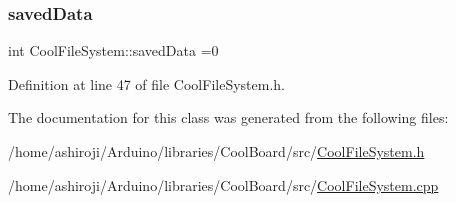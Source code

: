 \subsubsection{\texorpdfstring{saved\+Data}{savedData}}
{\footnotesize\ttfamily int Cool\+File\+System\+::saved\+Data =0\hspace{0.3cm}{\ttfamily [private]}}



Definition at line 47 of file Cool\+File\+System.\+h.



The documentation for this class was generated from the following files\+:\begin{DoxyCompactItemize}
\item 
/home/ashiroji/\+Arduino/libraries/\+Cool\+Board/src/\hyperlink{_cool_file_system_8h}{Cool\+File\+System.\+h}\item 
/home/ashiroji/\+Arduino/libraries/\+Cool\+Board/src/\hyperlink{_cool_file_system_8cpp}{Cool\+File\+System.\+cpp}\end{DoxyCompactItemize}
